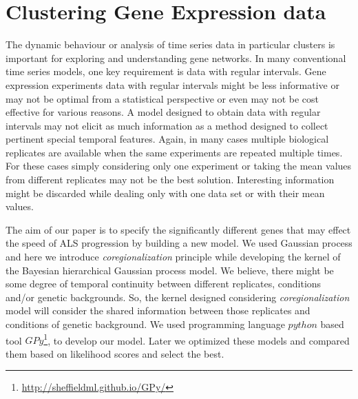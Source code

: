 
\chapter{Clustering Gene Expression data}

\ifpdf
    \graphicspath{{Chapter5/Figs/Raster/}{Chapter5/Figs/PDF/}{Chapter5/Figs/}}
\else
    \graphicspath{{Chapter5/Figs/Vector/}{Chapter5/Figs/}}
\fi

The dynamic behaviour or analysis of time series data in particular clusters is important for exploring and understanding gene networks. In many conventional time series models, one key requirement is data with regular intervals. Gene expression experiments data with regular intervals might be less informative or may not be optimal from a statistical perspective or even may not be cost effective for various reasons. A model designed to obtain data with regular intervals may not elicit as much information as a method designed to collect pertinent special temporal features. Again, in many cases multiple biological replicates are available when the same experiments are repeated multiple times. For these cases simply considering only one experiment or taking the mean values from different replicates may not be the best solution. Interesting information might be discarded while dealing only with one data set or with their mean values.

The aim of our paper is to specify the significantly different genes that may effect the speed of ALS progression by building a new model. We used Gaussian process and here we introduce  \emph{coregionalization} principle while developing the kernel of the Bayesian hierarchical Gaussian process model. We believe, there might be some degree of temporal continuity between different replicates, conditions and/or genetic backgrounds. So, the kernel designed considering \emph{coregionalization} model will consider the shared information between those replicates and conditions of genetic background. We used programming language $python$ based tool $GPy$\footnote{\url{http://sheffieldml.github.io/GPy/}}, to develop our model. Later we optimized these models and compared them based on likelihood scores and select the best.

